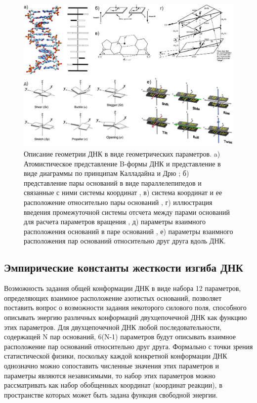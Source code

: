 \begin{figure}[H] 
  \center
  \includegraphics [width=\textwidth] {images/p1/DNA_param}
  \caption[Описание геометрии ДНК в виде геометрических параметров]{Описание геометрии ДНК в виде геометрических параметров. a) Атомистическое представление B-формы ДНК и представление в виде диаграммы по принципам Калладайна и Дрю \cite{calladine_understanding_2004}; б) представление пары оснований в виде параллелепипедов и связанные с ними системы координат \cite{el_hassan_assessment_1995}, в) система координат и ее расположение относительно пары оснований \cite{olson_standard_2001}, г) иллюстрация введения промежуточной системы отсчета между парами оснований для расчета параметров вращения  \cite{el_hassan_assessment_1995}, д) параметры взаимного расположения оснований в паре оснований \cite{lu_3dna_2003}, е) параметры взаимного расположения пар оснований относительно друг друга вдоль ДНК.} 
  \label{fig:p1:DNA_param}
\end{figure}

\subsection{Эмпирические константы жесткости изгиба ДНК}
Возможность задания общей конформации ДНК в виде набора 12 параметров, определяющих взаимное расположение азотистых оснований, позволяет поставить вопрос о возможности задания некоторого силового поля, способного описывать энергию различных конформаций двухцепочечной ДНК как функцию этих параметров. Для двухцепочечной ДНК любой последовательности, содержащей N пар оснований, 6(N-1) параметров будут описывать взаимное расположение пар оснований относительно друг друга. Формально с точки зрения статистической физики, поскольку каждой конкретной конформации ДНК однозначно можно сопоставить численные значения этих параметров и параметры являются независимыми, то набор этих параметров можно рассматривать как набор обобщенных координат (координат реакции), в пространстве которых может быть задана функция свободной энергии.

